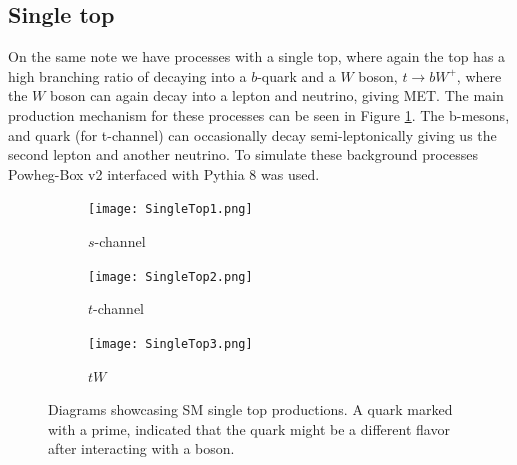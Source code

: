 \documentclass[12pt, a4paper]{book}
\begin{document}
\subsection{Single top}
On the same note we have processes with a single top, where again the top has a high branching ratio of decaying into a $b$-quark and a $W$ boson, $t\rightarrow bW^+$, where the $W$ boson can again decay into a lepton and neutrino, giving 
MET. The main production mechanism for these processes can be seen in Figure \ref{fig:T_BKG}. The b-mesons, and quark (for t-channel) can occasionally decay semi-leptonically giving us the second lepton and another neutrino. To simulate these background processes Powheg-Box v2 \cite{PowHeg} interfaced with Pythia 8 \cite{Pythia} was used.
\begin{figure}[!ht]
    \centering
    \begin{subfigure}[b]{0.3\textwidth}
        \centering
        \texttt{[image: SingleTop1.png]}
        \caption{$s$-channel}
    \end{subfigure}
    \hfill
    \begin{subfigure}[b]{0.3\textwidth}
        \centering
        \texttt{[image: SingleTop2.png]}
        \caption{$t$-channel}
    \end{subfigure}
    \hfill
    \begin{subfigure}[b]{0.3\textwidth}
        \centering
        \texttt{[image: SingleTop3.png]}
        \caption{$tW$}
    \end{subfigure}
    \caption[Single Top production]{Diagrams showcasing SM single top productions.  A quark marked with a prime, indicated that the quark might be a different flavor after interacting with a boson.}\label{fig:T_BKG}
\end{figure}
\end{document}
